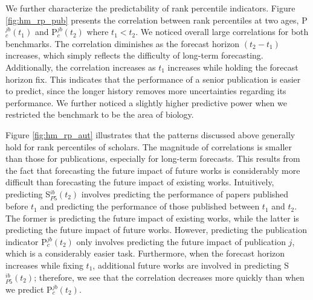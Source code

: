 We further characterize the predictability of rank percentile indicators. Figure \ref{fig:hm_rp_pub} presents the correlation between rank percentiles at two ages, P$_c^{jb}(t_1)$ and P$_c^{jb}(t_2)$ where $t_1<t_2$. We noticed overall large correlations for both benchmarks. The correlation diminishes as the forecast horizon $(t_2-t_1)$ increases, which simply reflects the difficulty of long-term forecasting. Additionally, the correlation increases as $t_1$ increases while holding the forecast horizon fix. This indicates that the performance of a senior publication is easier to predict, since the longer history removes more uncertainties regarding its performance. We further noticed a slightly higher predictive power when we restricted the benchmark to be the area of biology. 

Figure \ref{fig:hm_rp_aut} illustrates that the patterns discussed above generally hold for rank percentiles of scholars. The magnitude of correlations is smaller than those for publications, especially for long-term forecasts. This results from the fact that forecasting the future impact of future works is considerably more difficult than forecasting the future impact of existing works. Intuitively, predicting S$_{P5}^{ib}(t_2)$ involves predicting the performance of papers published before $t_1$ and predicting the performance of those published between $t_1$ and $t_2$. The former is predicting the future impact of existing works, while the latter is predicting the future impact of future works. However, predicting the publication indicator P$_c^{jb}(t_2)$ only involves predicting the future impact of publication $j$, which is a considerably easier task. Furthermore, when the forecast horizon increases while fixing $t_1$, additional future works are involved in predicting S$_{P5}^{ib}(t_2)$; therefore, we see that the correlation decreases more quickly than when we predict P$_c^{jb}(t_2)$. 

